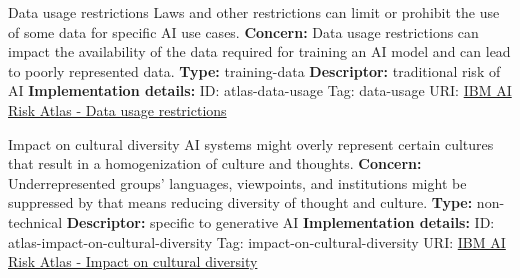 \documentclass[a4paper,12pt]{article}
\begin{document}
\begin{definitionbox}{Data usage restrictions}
Laws and other restrictions can limit or prohibit the use of some data for specific AI use cases.\newline\newline
\textbf{Concern: }Data usage restrictions can impact the availability of the data required for training an AI model and can lead to poorly represented data.\newline\newline
\textbf{Type: }training-data\newline
\textbf{Descriptor: }traditional risk of AI \newline\newline
\textbf{Implementation details: } \newline
ID: atlas-data-usage \newline
Tag: data-usage \newline
URI:  \href{https://www.ibm.com/docs/en/watsonx/saas?topic=SSYOK8/wsj/ai-risk-atlas/data-usage.html}{IBM AI Risk Atlas - Data usage restrictions}\newline
\end{definitionbox}
\begin{definitionbox}{Impact on cultural diversity}
AI systems might overly represent certain cultures that result in a homogenization of culture and thoughts.\newline\newline
\textbf{Concern: }Underrepresented groups' languages, viewpoints, and institutions might be suppressed by that means reducing diversity of thought and culture.\newline\newline
\textbf{Type: }non-technical\newline
\textbf{Descriptor: }specific to generative AI \newline\newline
\textbf{Implementation details: } \newline
ID: atlas-impact-on-cultural-diversity \newline
Tag: impact-on-cultural-diversity \newline
URI:  \href{https://www.ibm.com/docs/en/watsonx/saas?topic=SSYOK8/wsj/ai-risk-atlas/impact-on-cultural-diversity.html}{IBM AI Risk Atlas - Impact on cultural diversity}\newline
\end{definitionbox}
\end{document}
